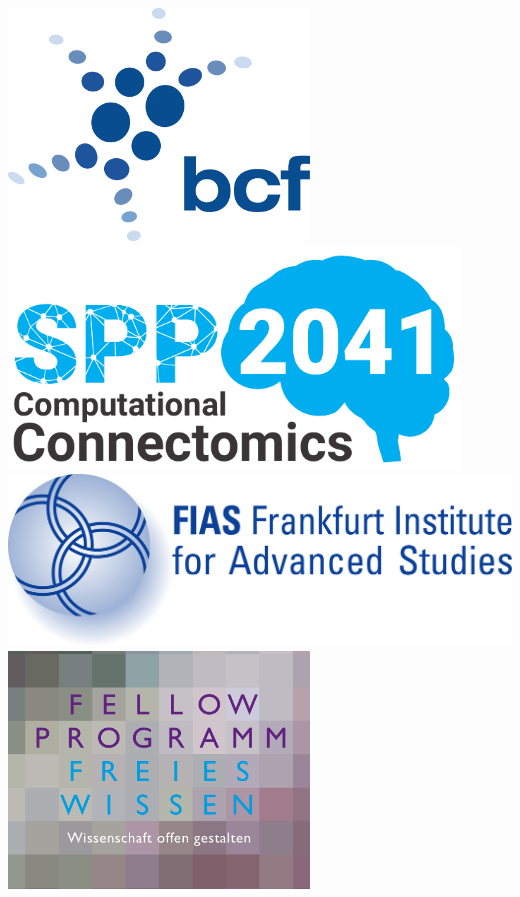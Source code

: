 \documentclass[a0,portrait]{a0poster}
\begin{document}
\begin{minipage}[b]{0.5\linewidth}
  \centering
  
  \vspace{-2.2cm}
  \includegraphics[width=8cm]{bcf_logo_2000.png} \hspace{3cm}
  \includegraphics[width=12cm]{spp2041_logo.pdf}\\
  \vspace{1.2cm}
  \includegraphics[width=15.5cm]{FIAS-logo.pdf}  \hspace{3cm}           \includegraphics[width=8cm]{wosf_tiny.png}
  
\end{minipage}
\end{document}
